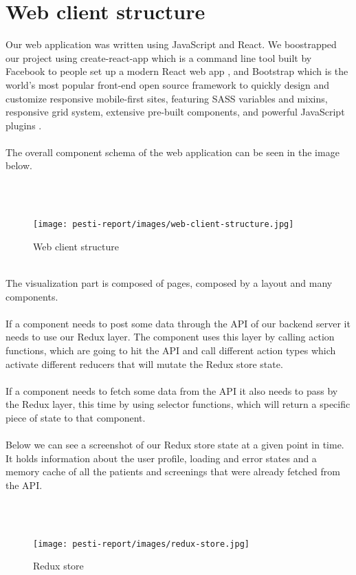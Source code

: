 \section{Web client structure}

Our web application was written using JavaScript and React. We boostrapped our project using create-react-app which is a command line tool built by Facebook to people set up a modern React web app \cite{CreateReactApp}, and Bootstrap which is the world’s most popular front-end open source framework to quickly design and customize responsive mobile-first sites, featuring SASS variables and mixins, responsive grid system, extensive pre-built components, and powerful JavaScript plugins \cite{Bootstrap}.
\\ \\
The overall component schema of the web application can be seen in the image below.

\\ \\
\begin{figure}[H]
	\centering
	\texttt{[image: pesti-report/images/web-client-structure.jpg]}
	\caption{Web client structure}
	\label{fig:web-client-structure}
\end{figure}
\\

The visualization part is composed of pages, composed by a layout and many components.
\\ \\
If a component needs to post some data through the API of our backend server it needs to use our Redux layer. The component uses this layer by calling action functions, which are going to hit the API and call different action types which activate different reducers that will mutate the Redux store state.
\\ \\
If a component needs to fetch some data from the API it also needs to pass by the Redux layer, this time by using selector functions, which will return a specific piece of state to that component.
\\ \\
Below we can see a screenshot of our Redux store state at a given point in time. It holds information about the user profile, loading and error states and a memory cache of all the patients and screenings that were already fetched from the API.

\\ \\
\begin{figure}[H]
	\centering
	\texttt{[image: pesti-report/images/redux-store.jpg]}
	\caption{Redux store}
	\label{fig:redux-store}
\end{figure}
\\

